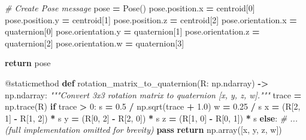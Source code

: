 \documentclass[
]{article}
\newenvironment{Shaded}{\begin{snugshade}}{\end{snugshade}}
\newcommand{\AttributeTok}[1]{\textcolor[rgb]{0.13,0.29,0.53}{#1}}
\newcommand{\CommentTok}[1]{\textcolor[rgb]{0.56,0.35,0.01}{\textit{#1}}}
\newcommand{\ControlFlowTok}[1]{\textcolor[rgb]{0.13,0.29,0.53}{\textbf{#1}}}
\newcommand{\DecValTok}[1]{\textcolor[rgb]{0.00,0.00,0.81}{#1}}
\newcommand{\FloatTok}[1]{\textcolor[rgb]{0.00,0.00,0.81}{#1}}
\newcommand{\KeywordTok}[1]{\textcolor[rgb]{0.13,0.29,0.53}{\textbf{#1}}}
\newcommand{\NormalTok}[1]{#1}
\newcommand{\OperatorTok}[1]{\textcolor[rgb]{0.81,0.36,0.00}{\textbf{#1}}}
\begin{document}
\begin{Shaded}
\begin{Highlighting}[]
        \CommentTok{\# Create Pose message}
\NormalTok{        pose }\OperatorTok{=}\NormalTok{ Pose()}
\NormalTok{        pose.position.x }\OperatorTok{=}\NormalTok{ centroid[}\DecValTok{0}\NormalTok{]}
\NormalTok{        pose.position.y }\OperatorTok{=}\NormalTok{ centroid[}\DecValTok{1}\NormalTok{]}
\NormalTok{        pose.position.z }\OperatorTok{=}\NormalTok{ centroid[}\DecValTok{2}\NormalTok{]}
\NormalTok{        pose.orientation.x }\OperatorTok{=}\NormalTok{ quaternion[}\DecValTok{0}\NormalTok{]}
\NormalTok{        pose.orientation.y }\OperatorTok{=}\NormalTok{ quaternion[}\DecValTok{1}\NormalTok{]}
\NormalTok{        pose.orientation.z }\OperatorTok{=}\NormalTok{ quaternion[}\DecValTok{2}\NormalTok{]}
\NormalTok{        pose.orientation.w }\OperatorTok{=}\NormalTok{ quaternion[}\DecValTok{3}\NormalTok{]}

        \ControlFlowTok{return}\NormalTok{ pose}

    \AttributeTok{@staticmethod}
    \KeywordTok{def}\NormalTok{ rotation\_matrix\_to\_quaternion(R: np.ndarray) }\OperatorTok{{-}\textgreater{}}\NormalTok{ np.ndarray:}
        \CommentTok{"""Convert 3x3 rotation matrix to quaternion [x, y, z, w]."""}
\NormalTok{        trace }\OperatorTok{=}\NormalTok{ np.trace(R)}
        \ControlFlowTok{if}\NormalTok{ trace }\OperatorTok{\textgreater{}} \DecValTok{0}\NormalTok{:}
\NormalTok{            s }\OperatorTok{=} \FloatTok{0.5} \OperatorTok{/}\NormalTok{ np.sqrt(trace }\OperatorTok{+} \FloatTok{1.0}\NormalTok{)}
\NormalTok{            w }\OperatorTok{=} \FloatTok{0.25} \OperatorTok{/}\NormalTok{ s}
\NormalTok{            x }\OperatorTok{=}\NormalTok{ (R[}\DecValTok{2}\NormalTok{, }\DecValTok{1}\NormalTok{] }\OperatorTok{{-}}\NormalTok{ R[}\DecValTok{1}\NormalTok{, }\DecValTok{2}\NormalTok{]) }\OperatorTok{*}\NormalTok{ s}
\NormalTok{            y }\OperatorTok{=}\NormalTok{ (R[}\DecValTok{0}\NormalTok{, }\DecValTok{2}\NormalTok{] }\OperatorTok{{-}}\NormalTok{ R[}\DecValTok{2}\NormalTok{, }\DecValTok{0}\NormalTok{]) }\OperatorTok{*}\NormalTok{ s}
\NormalTok{            z }\OperatorTok{=}\NormalTok{ (R[}\DecValTok{1}\NormalTok{, }\DecValTok{0}\NormalTok{] }\OperatorTok{{-}}\NormalTok{ R[}\DecValTok{0}\NormalTok{, }\DecValTok{1}\NormalTok{]) }\OperatorTok{*}\NormalTok{ s}
        \ControlFlowTok{else}\NormalTok{:}
            \CommentTok{\# ... (full implementation omitted for brevity)}
            \ControlFlowTok{pass}
        \ControlFlowTok{return}\NormalTok{ np.array([x, y, z, w])}
\end{Highlighting}
\end{Shaded}
\end{document}
